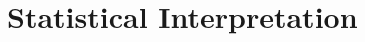 \documentclass[edeposit,fullpage]{uiucthesis2009}
\begin{document}
\chapter{Statistical Interpretation}






%


%

\appendix
%

%

\backmatter


%

\end{document}
